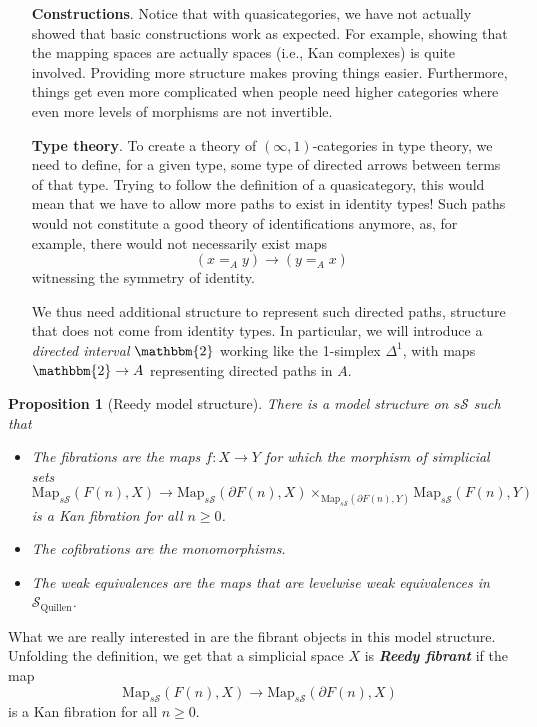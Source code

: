 \documentclass{article}
\newcommand{\textbi}[1]{\textbf{\textit{#1}}}
\newcommand{\cS}{\mathcal{S}}
\newcommand{\sS}{s\cS}
\newcommand{\Map}{\mathrm{Map}}
\newtheorem{prop}[subsection]{Proposition}
\theoremstyle{definition}
\begin{document}
\begin{itemize}
    \item[\textbf{Constructions}.] Notice that with quasicategories, we have not actually showed that basic constructions work as expected. For example, showing that the mapping spaces are actually spaces (i.e., Kan complexes) is quite involved. Providing more structure makes proving things easier. Furthermore, things get even more complicated when people need higher categories where even more levels of morphisms are not invertible.
    \item[\textbf{Type theory}.] To create a theory of $(\infty,1)$-categories in type theory, we need to define, for a given type, some type of directed arrows between terms of that type. Trying to follow the definition of a quasicategory, this would mean that we have to allow more paths to exist in identity types! Such paths would not constitute a good theory of identifications anymore, as, for example, there would not necessarily exist maps $$(x=_Ay)\to (y=_Ax)$$ witnessing the symmetry of identity. 
    \par We thus need additional structure to represent such directed paths, structure that does not come from identity types. In particular, we will introduce a \textit{directed interval} $\mathbbm{2}$ working like the 1-simplex $\Delta^1$, with maps $\mathbbm{2}\to A$ representing directed paths in $A$. 
\end{itemize}

\begin{prop}[Reedy model structure]
    There is a model structure on $\sS$ such that
    \begin{itemize}
        \item The fibrations are the maps $f:X\to Y$ for which the morphism of simplicial sets $$\Map_{\sS}(F(n),X)\to \Map_{\sS}(\partial F(n), X)\times_{\Map_{\sS}(\partial F(n),Y)}\Map_{\sS}(F(n),Y)$$ is a Kan fibration for all $n\geq 0$. 
        \item The cofibrations are the monomorphisms.
        \item The weak equivalences are the maps that are levelwise weak equivalences in $\cS_{\text{Quillen}}$.
    \end{itemize}
\end{prop}

What we are really interested in are the fibrant objects in this model structure. Unfolding the definition, we get that a simplicial space $X$ is \textbi{Reedy fibrant} if the map $$\Map_{\sS}(F(n),X)\to\Map_{\sS}(\partial F(n), X)$$ is a Kan fibration for all $n\geq 0$. 
\end{document}
